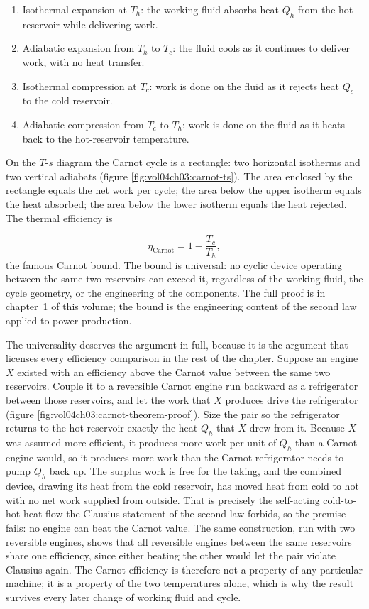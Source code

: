 \begin{enumerate}[leftmargin=*]
  \item Isothermal expansion at $T_h$: the working fluid absorbs heat
    $Q_h$ from the hot reservoir while delivering work.
  \item Adiabatic expansion from $T_h$ to $T_c$: the fluid cools as
    it continues to deliver work, with no heat transfer.
  \item Isothermal compression at $T_c$: work is done on the fluid as
    it rejects heat $Q_c$ to the cold reservoir.
  \item Adiabatic compression from $T_c$ to $T_h$: work is done on
    the fluid as it heats back to the hot-reservoir temperature.
\end{enumerate}

On the $T$-$s$ diagram the Carnot cycle is a rectangle: two horizontal
isotherms and two vertical adiabats (figure
\ref{fig:vol04ch03:carnot-ts}). The area enclosed by the
rectangle equals the net work per cycle; the area below the upper
isotherm equals the heat absorbed; the area below the lower isotherm
equals the heat rejected. The thermal efficiency is


\[
\eta_{\text{Carnot}} = 1 - \frac{T_c}{T_h},
\]
the famous Carnot bound. The bound is universal: no cyclic device
operating between the same two reservoirs can exceed it, regardless
of the working fluid, the cycle geometry, or the engineering of the
components. The full proof is in chapter~1 of this volume; the bound is
the engineering content of the second law applied to power
production.

The universality deserves the argument in full, because it is the
argument that licenses every efficiency comparison in the rest of the
chapter. Suppose an engine $X$ existed with an efficiency above the
Carnot value between the same two reservoirs. Couple it to a reversible
Carnot engine run backward as a refrigerator between those reservoirs,
and let the work that $X$ produces drive the refrigerator
(figure \ref{fig:vol04ch03:carnot-theorem-proof}). Size the pair so the
refrigerator returns to the hot reservoir exactly the heat $Q_h$ that
$X$ drew from it. Because $X$ was assumed more efficient, it produces
more work per unit of $Q_h$ than a Carnot engine would, so it produces
more work than the Carnot refrigerator needs to pump $Q_h$ back up. The
surplus work is free for the taking, and the combined device, drawing
its heat from the cold reservoir, has moved heat from cold to hot with
no net work supplied from outside. That is precisely the self-acting
cold-to-hot heat flow the Clausius statement of the second law forbids,
so the premise fails: no engine can beat the Carnot value. The same
construction, run with two reversible engines, shows that all reversible
engines between the same reservoirs share one efficiency, since either
beating the other would let the pair violate Clausius again. The Carnot
efficiency is therefore not a property of any particular machine; it is
a property of the two temperatures alone, which is why the result
survives every later change of working fluid and cycle.


